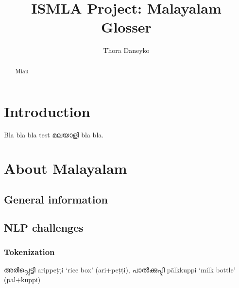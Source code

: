 \documentclass[a4paper]{article}
\author{Thora Daneyko}
\title{ISMLA Project: Malayalam Glosser}
\begin{document}
\maketitle

\begin{abstract}
Miau
\end{abstract}


\section{Introduction}

Bla bla bla test മലയാളി bla bla.

\section{About Malayalam}

\subsection{General information}

\subsection{NLP challenges}

\subsubsection{Tokenization}

അരിപ്പെട്ടി arippeṭṭi `rice box' (ari+peṭṭi), പാൽക്കുപ്പി pālkkuppi `milk bottle' (pāl+kuppi) \parencite[p.~397]{asherKumari}
\end{document}

